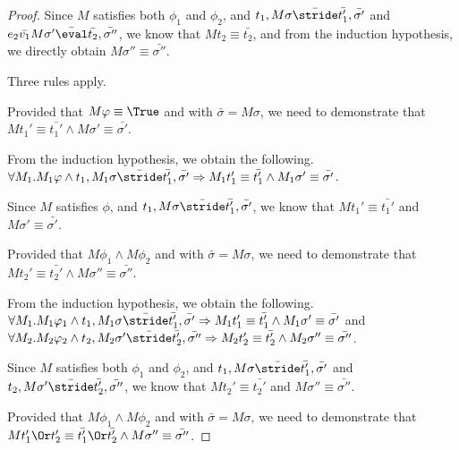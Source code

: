\begin{proof}
{{    Since $M$ satisfies both $\phi_1$ and $\phi_2$, and $t_1,M\sigma \bar{\stride} \bar{t_1'},\bar{\sigma'}$ and $e_2\bar{v_1}M\sigma'\bar{\eval}\bar{t_2},\bar{\sigma''}$,
    we know that $M t_2\equiv\bar{t_2}$,
    and from the induction hypothesis, we directly obtain  $M\sigma''\equiv \bar{\sigma''}$.

    }
  }

  {
  Three rules apply.\\
    {Provided that $M\phi\equiv\True$ and  with $\bar{\sigma}=M\sigma$,
    we need to demonstrate that $M t_1'\equiv \bar{t_1'} \land M\sigma'\equiv \bar{\sigma'}$.

    From the induction hypothesis, we obtain the following.\\
    $\forall M_1 . M_1 \phi \land t_1,M_1\sigma \bar{\stride} \bar{t_1'},\bar{\sigma'}\implies M_1 t_1'\equiv\bar{t_1'}\land M_1\sigma' \equiv \bar{\sigma'}$.

    Since $M$ satisfies $\phi$, and $t_1,M\sigma \bar{\stride} \bar{t_1'},\bar{\sigma'}$,
    we know that $M t_1'\equiv\bar{t_1'}$ and $M\sigma'\equiv \bar{\sigma'}$.

    }
    {Provided that $M\phi_1\land M\phi_2$ and  with $\bar{\sigma}=M\sigma$,
    we need to demonstrate that $M t_2'\equiv \bar{t_2'} \land M\sigma''\equiv \bar{\sigma''}$.

    From the induction hypothesis, we obtain the following.\\
    $\forall M_1 . M_1 \phi_1 \land t_1,M_1\sigma \bar{\stride} \bar{t_1'},\bar{\sigma'}\implies M_1 t_1'\equiv\bar{t_1'}\land M_1\sigma' \equiv \bar{\sigma'}$ and \\
    $\forall M_2 . M_2 \phi_2 \land t_2,M_2\sigma' \bar{\stride} \bar{t_2'},\bar{\sigma''}\implies M_2 t_2'\equiv\bar{t_2'}\land M_2\sigma'' \equiv \bar{\sigma''}$.

    Since $M$ satisfies both $\phi_1$ and $\phi_2$, and $t_1,M\sigma \bar{\stride} \bar{t_1'},\bar{\sigma'}$ and $t_2,M\sigma'\bar{\stride}\bar{t_2'},\bar{\sigma''}$,
    we know that $M t_2'\equiv\bar{t_2'}$ and $M\sigma''\equiv \bar{\sigma''}$.

    }
    {Provided that $M\phi_1\land M\phi_2$ and  with $\bar{\sigma}=M\sigma$,
    we need to demonstrate that $M t_1'\Or t_2'\equiv \bar{t_1'}\Or\bar{t_2'} \land M\sigma''\equiv \bar{\sigma''}$.

}}
\end{proof}

